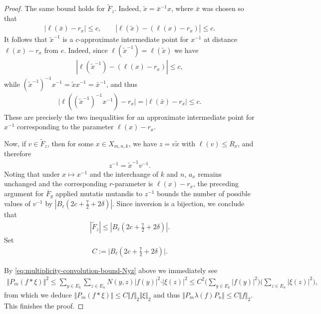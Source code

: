 \documentclass[10pt,a4paper]{amsart}
\begin{document}
\begin{proof}
    The same bound holds for $\tilde{F}_z$. Indeed, 
$\tilde{x}=\bar x^{-1}x$, where $\bar x$ was chosen so that
\begin{align*}
    |\ell(\bar x)-r_x|\leq c,
    \qquad
    |\ell(\tilde{x})-(\ell(x)-r_x)|\leq c.
\end{align*}
It follows that $\tilde{x}^{-1}$ is a $c$-approximate intermediate
point for $x^{-1}$ at distance $\ell(x)-r_x$ from $e$. Indeed, since $\ell(\tilde{x}^{-1}) = \ell(\tilde{x})$ we have
\begin{align*}
    |\ell(\tilde{x}^{-1})-(\ell(x)-r_x)|\leq c,
\end{align*}
while
$(\tilde{x}^{-1})^{-1}x^{-1}
    =\tilde{x} x^{-1}
    =\bar x^{-1}$,
and thus
\begin{align*}
     \bigl|\ell((\tilde{x}^{-1})^{-1}x^{-1})-r_x\bigr|
    =|\ell(\bar x)-r_x|
    \leq c.
\end{align*} 
These are precisely the two inequalities
for an approximate intermediate point for $x^{-1}$ corresponding to
the 
parameter $\ell(x)-r_x$.

Now, if $v\in\tilde{F}_z$, then for some $x\in X_{m,n,k}$, we have $z=v\tilde{x}$ with $\ell(v)\leq R_x$, 
and therefore
\begin{align*}
    z^{-1}=\tilde{x}^{-1}v^{-1}.
\end{align*}
Noting that under $x \mapsto x^{-1}$ and the interchange of $k$ and $n$, $a_x$ remains unchanged and the corresponding $r$-parameter is $\ell(x) - r_x$, the preceding argument for $\overline{F}_y$ applied mutatis mutandis to $z^{-1}$  bounds the number of possible
values of $v^{-1}$ by $|B_\ell\!\left(2c+\frac72+2\delta\right)|$. 
Since inversion is a bijection, we conclude that
\begin{align*}
    |\tilde{F}_z|
    \leq
    \left|B_\ell\!\left(2c+\frac72+2\delta\right)\right|.
\end{align*}
    Set 
    \begin{align*}
        C := \vert B_\ell(2c + \frac{7}{2} + 2\delta) \vert.
    \end{align*}
    
    By \eqref{eq:multiplicity-convolution-bound-Nyz} above we immediately see    
    \begin{align*}
         \Vert P_m (f*\xi) \Vert^2 \leq  \sum_{y \in E_k} \sum_{z\in E_n} N(y,z) \vert f(y) \vert^2 \cdot \vert \xi(z) \vert^2 \leq C^2 \bigg( \sum_{y\in E_k} \vert f(y) \vert^2 \bigg)\bigg( \sum_{z \in E_n} \vert \xi(z) \vert^2 \bigg),
    \end{align*}
    from which we deduce $\Vert P_m (f*\xi)\Vert \leq C \Vert f\Vert_2 \Vert \xi \Vert_2$ and thus $\Vert P_m \lambda(f) P_n \Vert \leq C \Vert f \Vert_2$. This finishes the proof. 
\end{proof}
\end{document}
